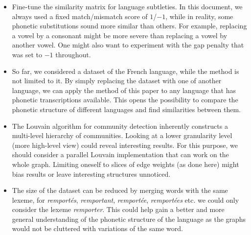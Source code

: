 \begin{itemize}
    \item Fine-tune the similarity matrix for language subtleties. In this document, we always used a fixed match/mismatch score of $1$/$-1$, while in reality, some phonetic substitutions sound more similar than others. For example, replacing a vowel by a consonant might be more severe than replacing a vowel by another vowel. One might also want to experiment with the gap penalty that was set to $-1$ throughout.
    
    \item So far, we considered a dataset of the French language, while the method is not limited to it. By simply replacing the dataset with one of another language, we can apply the method of this paper to any language that has phonetic transcriptions available. This opens the possibility to compare the phonetic structure of different languages and find similarities between them.
    
    \item The Louvain algorithm \cite{louvain} for community detection inherently constructs a multi-level hierarchy of communities. Looking at a lower granularity level (more high-level view) could reveal interesting results. For this purpose, we should consider a parallel Louvain implementation that can work on the whole graph. Limiting oneself to slices of edge weights (as done here) might bias results or leave interesting structures unnoticed.
    
    \item The size of the dataset can be reduced by merging words with the same lexeme, \eg for \textit{remportés}, \textit{remportant}, \textit{remportée}, \textit{remportées} etc. we could only consider the lexeme \textit{remporter}. This could help gain a better and more general understanding of the phonetic structure of the language as the graphs would not be cluttered with variations of the same word.
\end{itemize}
